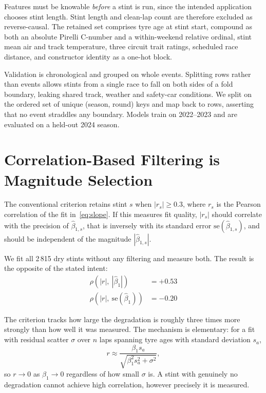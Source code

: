 \documentclass[conference]{IEEEtran}
\begin{document}
Features must be knowable \emph{before} a stint is run, since the intended
application chooses stint length. Stint length and clean-lap count are
therefore excluded as reverse-causal. The retained set comprises tyre age at
stint start, compound as both an absolute Pirelli C-number and a within-weekend
relative ordinal, stint mean air and track temperature, three circuit trait
ratings, scheduled race distance, and constructor identity as a one-hot block.

Validation is chronological and grouped on whole events. Splitting rows rather
than events allows stints from a single race to fall on both sides of a fold
boundary, leaking shared track, weather and safety-car conditions. We split on
the ordered set of unique (season, round) keys and map back to rows, asserting
that no event straddles any boundary. Models train on 2022--2023 and are
evaluated on a held-out 2024 season.

\section{Correlation-Based Filtering is Magnitude Selection}
\label{sec:bias}

The conventional criterion retains stint $s$ when $|r_s| \geq 0.3$, where
$r_s$ is the Pearson correlation of the fit in~\eqref{eq:slope}. If this
measures fit quality, $|r_s|$ should correlate with the precision of
$\hat{\beta}_{1,s}$, that is inversely with its standard error
$\mathrm{se}(\hat{\beta}_{1,s})$, and should be independent of the magnitude
$|\hat{\beta}_{1,s}|$.

We fit all 2\,815 dry stints without any filtering and measure both. The result
is the opposite of the stated intent:
\begin{align}
\rho\!\left(|r|,\ |\hat{\beta}_1|\right) &= +0.53 \\
\rho\!\left(|r|,\ \mathrm{se}(\hat{\beta}_1)\right) &= -0.20
\end{align}

The criterion tracks how large the degradation is roughly three times more
strongly than how well it was measured. The mechanism is elementary: for a fit
with residual scatter $\sigma$ over $n$ laps spanning tyre ages with standard
deviation $s_a$,
\begin{equation}
r \approx \frac{\beta_1 s_a}{\sqrt{\beta_1^2 s_a^2 + \sigma^2}},
\end{equation}
so $r \to 0$ as $\beta_1 \to 0$ regardless of how small $\sigma$ is. A stint
with genuinely no degradation cannot achieve high correlation, however
precisely it is measured.
\end{document}
